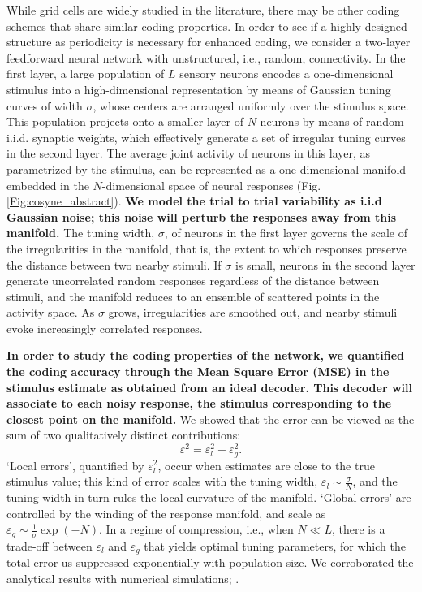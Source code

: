 \documentclass[a4paper]{article}%
\begin{document}
While grid cells are widely studied in the literature, there may be other
coding schemes that share similar coding properties. In order to see
if a highly designed structure as periodicity is necessary
for enhanced coding, we consider a two-layer feedforward
neural network with unstructured, i.e., random, connectivity. In the
first layer, a large population of $L$ sensory neurons encodes a
one-dimensional stimulus into a high-dimensional representation by
means of Gaussian tuning curves of width $\sigma$, whose centers are
arranged uniformly over the stimulus space. This population projects
onto a smaller layer of $N$ neurons by means of random i.i.d. synaptic
weights, which effectively generate a set of irregular tuning curves
in the second layer. The average  joint activity of neurons in this
layer, as parametrized by the stimulus, can be represented as a
one-dimensional manifold embedded in the $N$-dimensional
space of neural responses (Fig.\ref{Fig:cosyne_abstract}). \textbf{We model the trial to trial variability as i.i.d Gaussian noise; this noise will perturb the responses away from this manifold.} The tuning
width, $\sigma$, of neurons in the first layer
 governs the scale of the irregularities
in the manifold, that is, the extent to which responses
preserve the distance between two nearby stimuli. If $\sigma$
is small, neurons in the second layer generate uncorrelated random responses
regardless of the distance between stimuli, and the manifold
reduces to an ensemble of scattered points in the activity
space. As $\sigma$ grows, irregularities are smoothed
out, and nearby stimuli evoke increasingly correlated responses.

\textbf{In order to study the coding properties of the network, we quantified the coding accuracy through the Mean Square Error (MSE)  in the stimulus estimate as obtained from an
ideal decoder. This decoder will associate to each noisy response, the stimulus corresponding to the closest point on the manifold. }We showed that the error can be viewed as the sum of two
qualitatively distinct contributions:
\begin{equation}
\varepsilon^{2}=\varepsilon_{l}^{2}+\varepsilon_{g}^{2}.\label{Eq:LvsG}%
\end{equation}
`Local errors', quantified by $\varepsilon_{l}^{2}$, occur
when estimates are close to the true stimulus value; this kind of
error scales with the tuning width,  $\varepsilon_{l}\sim\frac
{\sigma}{N}$, and the tuning width in turn rules the local curvature
of the manifold. `Global errors' are controlled by
the winding of the response manifold, and scale as
$\varepsilon_{g}\sim\frac{1}{\sigma}\exp{(-N)}$. In a regime of
compression, i.e.,  when $N\ll L$, there is a trade-off
between $\varepsilon_{l}$ and $\varepsilon_{g}$ that yields optimal tuning
parameters, for which the total error us suppressed exponentially with
population size. We corroborated the analytical results with
numerical simulations; .
\end{document}
